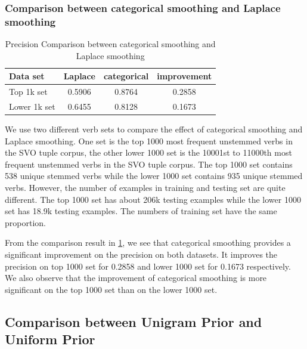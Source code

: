 \subsubsection{Comparison between categorical smoothing and Laplace smoothing}

\begin{table}[t]
\caption{Precision Comparison between categorical smoothing and Laplace smoothing}
\label{tab-smoothing-comparison}
\vskip 0.15in
\begin{center}
\begin{small}
\begin{sc}
\begin{tabular}{l|cc|c}
\hline
\abovespace\belowspace
Data set & Laplace & categorical & improvement \\
\hline
\abovespace
Top 1k set & 0.5906 & 0.8764 & 0.2858 \\
\belowspace
Lower 1k set & 0.6455 & 0.8128 & 0.1673 \\
\hline
\end{tabular}
\end{sc}
\end{small}
\end{center}
\vskip -0.1in
\end{table}

We use two different verb sets to compare the effect of categorical smoothing and Laplace smoothing. One set is the top 1000 most frequent unstemmed verbs in the SVO tuple corpus, the other lower 1000 set is the 10001st to 11000th most frequent unstemmed verbs in the SVO tuple corpus. The top 1000 set contains 538 unique stemmed verbs while the lower 1000 set contains 935 unique stemmed verbs. However, the number of examples in training and testing set are quite different. The top 1000 set has about 206k testing examples while the lower 1000 set has 18.9k testing examples. The numbers of training set have the same proportion.

From the comparison result in \ref{tab-smoothing-comparison}, we see that categorical smoothing provides a significant improvement on the precision on both datasets. It improves the precision on top 1000 set for 0.2858 and lower 1000 set for 0.1673 respectively. We also observe that the improvement of categorical smoothing is more significant on the top 1000 set than on the lower 1000 set.

\subsection{Comparison between Unigram Prior and Uniform Prior}

